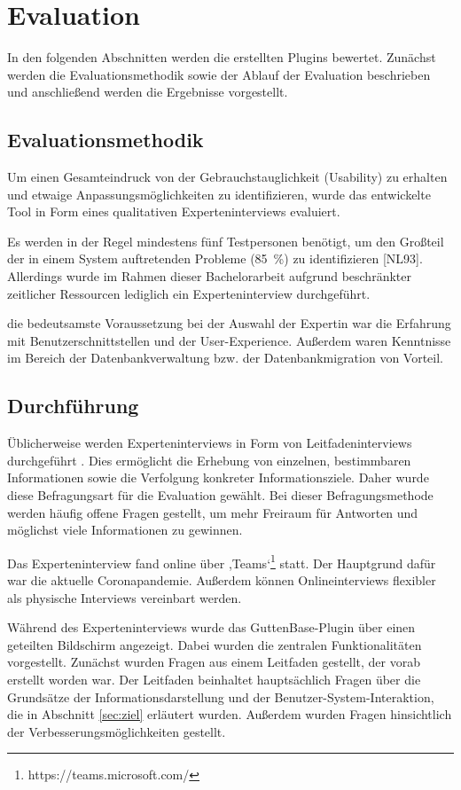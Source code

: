 \chapter{Evaluation}
\label{sec:evaluation}
In den folgenden Abschnitten werden die erstellten Plugins bewertet. Zunächst werden die Evaluationsmethodik sowie der Ablauf der Evaluation beschrieben und anschließend werden die Ergebnisse vorgestellt.

\section{Evaluationsmethodik}

Um einen Gesamteindruck von der Gebrauchstauglichkeit (Usability) zu erhalten und etwaige Anpassungsmöglichkeiten zu identifizieren, wurde das entwickelte Tool in Form eines qualitativen Experteninterviews evaluiert.

Es werden in der Regel mindestens fünf Testpersonen benötigt, um den Großteil der in einem System auftretenden Probleme (85 \%) zu identifizieren [NL93]. Allerdings wurde im Rahmen dieser Bachelorarbeit aufgrund beschränkter zeitlicher Ressourcen lediglich ein Experteninterview durchgeführt.

die bedeutsamste Voraussetzung bei der Auswahl der Expertin war die Erfahrung mit Benutzerschnittstellen und der User-Experience. Außerdem waren Kenntnisse im Bereich der Datenbankverwaltung bzw. der Datenbankmigration von Vorteil.

\section{Durchführung}

Üblicherweise werden Experteninterviews in Form von Leitfadeninterviews durchgeführt \cite{mayring1994qualitative}. Dies ermöglicht die Erhebung von einzelnen, bestimmbaren Informationen sowie die Verfolgung konkreter Informationsziele. Daher wurde diese Befragungsart für die Evaluation gewählt. Bei dieser Befragungsmethode werden häufig offene Fragen gestellt, um mehr Freiraum für Antworten und möglichst viele Informationen zu gewinnen.

Das Experteninterview fand online über ,Teams‘\footnote{https://teams.microsoft.com/} statt. Der Hauptgrund dafür war die aktuelle Coronapandemie. Außerdem können Onlineinterviews flexibler als physische Interviews vereinbart werden.

Während des Experteninterviews wurde das GuttenBase-Plugin über einen geteilten Bildschirm angezeigt.
Dabei wurden die zentralen Funktionalitäten vorgestellt. Zunächst wurden Fragen aus einem Leitfaden gestellt, der vorab erstellt worden war. Der Leitfaden beinhaltet hauptsächlich Fragen über die Grundsätze der Informationsdarstellung und der Benutzer-System-Interaktion, die in Abschnitt \ref{sec:ziel} erläutert wurden. Außerdem wurden Fragen hinsichtlich der Verbesserungsmöglichkeiten gestellt.



